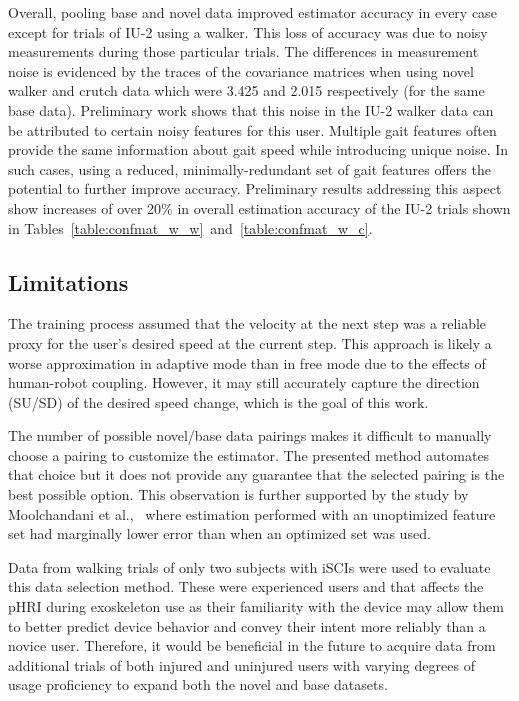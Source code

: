 Overall, pooling base and novel data improved estimator accuracy in every case except for trials of IU-2 using a walker. This loss of accuracy was due to noisy measurements during those particular trials. The differences in measurement noise is evidenced by the traces of the covariance matrices when using novel walker and crutch data which were 3.425 and 2.015 respectively (for the same base data). Preliminary work shows that this noise in the IU-2 walker data can be attributed to certain noisy features for this user. Multiple gait features often provide the same information about gait speed while introducing unique noise. In such cases, using a reduced, minimally-redundant set of gait features offers the potential to further improve accuracy. Preliminary results addressing this aspect show increases of over 20\% in overall estimation accuracy of the IU-2 trials shown in Tables~\ref{table:confmat_w_w}~and~\ref{table:confmat_w_c}.

\subsection{Limitations}

The training process assumed that the velocity at the next step was a reliable proxy for the user's desired speed at the current step.  This approach is likely a worse approximation in adaptive mode than in free mode due to the effects of human-robot coupling. However, it may still accurately capture the direction (SU/SD) of the desired speed change, which is the goal of this work.

The number of possible novel/base data pairings makes it difficult to manually choose a pairing to customize the estimator. The presented method automates that choice but it does not provide any guarantee that the selected pairing is the best possible option. This observation is further supported by the study  by Moolchandani et al.,~\cite{moolchandani2021design} where estimation performed with an unoptimized feature set had marginally lower error than when an optimized set was used. 

Data from walking trials of only two subjects with iSCIs were used to evaluate this data selection method. These were experienced users and that affects the pHRI during exoskeleton use as their familiarity with the device may allow them to better predict device behavior and convey their intent more reliably than a novice user. Therefore, it would be beneficial in the future to acquire data from additional trials of both injured and uninjured users with varying degrees of usage proficiency to expand both the novel and base datasets.

